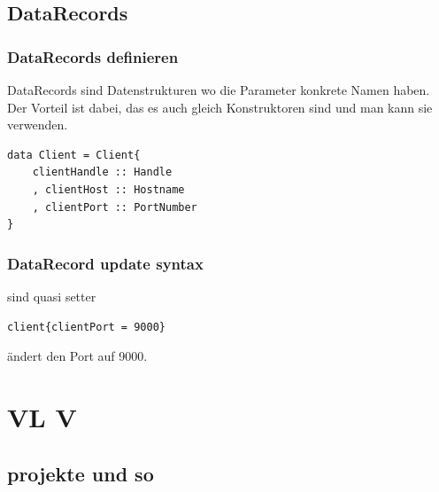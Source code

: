 \documentclass[ngerman,a4paper]{report}
\begin{document}
\section{DataRecords}
\subsection{DataRecords definieren}
DataRecords sind Datenstrukturen wo die Parameter konkrete Namen haben. Der Vorteil ist dabei, das es auch gleich Konstruktoren sind und man kann sie verwenden.
\begin{lstlisting}
data Client = Client{
	clientHandle :: Handle
	, clientHost :: Hostname
	, clientPort :: PortNumber
}
\end{lstlisting}

\subsection{DataRecord update syntax}
sind quasi setter
\begin{lstlisting}
client{clientPort = 9000}
\end{lstlisting}
ändert den Port auf 9000.\\

\chapter{VL V}
\section{projekte und so}
\end{document}
